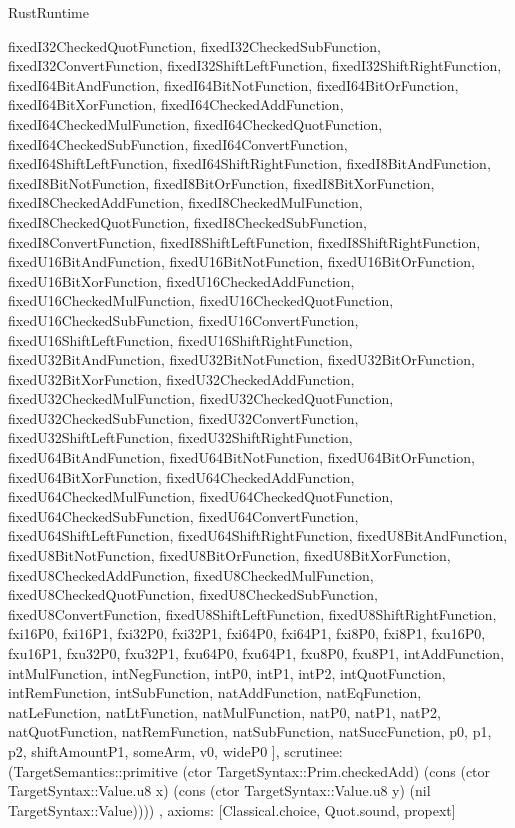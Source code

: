 \begin{lexlean}{RustRuntime}
\begin{semanticmodule}
{{      fixedI32CheckedQuotFunction,
      fixedI32CheckedSubFunction,
      fixedI32ConvertFunction,
      fixedI32ShiftLeftFunction,
      fixedI32ShiftRightFunction,
      fixedI64BitAndFunction,
      fixedI64BitNotFunction,
      fixedI64BitOrFunction,
      fixedI64BitXorFunction,
      fixedI64CheckedAddFunction,
      fixedI64CheckedMulFunction,
      fixedI64CheckedQuotFunction,
      fixedI64CheckedSubFunction,
      fixedI64ConvertFunction,
      fixedI64ShiftLeftFunction,
      fixedI64ShiftRightFunction,
      fixedI8BitAndFunction,
      fixedI8BitNotFunction,
      fixedI8BitOrFunction,
      fixedI8BitXorFunction,
      fixedI8CheckedAddFunction,
      fixedI8CheckedMulFunction,
      fixedI8CheckedQuotFunction,
      fixedI8CheckedSubFunction,
      fixedI8ConvertFunction,
      fixedI8ShiftLeftFunction,
      fixedI8ShiftRightFunction,
      fixedU16BitAndFunction,
      fixedU16BitNotFunction,
      fixedU16BitOrFunction,
      fixedU16BitXorFunction,
      fixedU16CheckedAddFunction,
      fixedU16CheckedMulFunction,
      fixedU16CheckedQuotFunction,
      fixedU16CheckedSubFunction,
      fixedU16ConvertFunction,
      fixedU16ShiftLeftFunction,
      fixedU16ShiftRightFunction,
      fixedU32BitAndFunction,
      fixedU32BitNotFunction,
      fixedU32BitOrFunction,
      fixedU32BitXorFunction,
      fixedU32CheckedAddFunction,
      fixedU32CheckedMulFunction,
      fixedU32CheckedQuotFunction,
      fixedU32CheckedSubFunction,
      fixedU32ConvertFunction,
      fixedU32ShiftLeftFunction,
      fixedU32ShiftRightFunction,
      fixedU64BitAndFunction,
      fixedU64BitNotFunction,
      fixedU64BitOrFunction,
      fixedU64BitXorFunction,
      fixedU64CheckedAddFunction,
      fixedU64CheckedMulFunction,
      fixedU64CheckedQuotFunction,
      fixedU64CheckedSubFunction,
      fixedU64ConvertFunction,
      fixedU64ShiftLeftFunction,
      fixedU64ShiftRightFunction,
      fixedU8BitAndFunction,
      fixedU8BitNotFunction,
      fixedU8BitOrFunction,
      fixedU8BitXorFunction,
      fixedU8CheckedAddFunction,
      fixedU8CheckedMulFunction,
      fixedU8CheckedQuotFunction,
      fixedU8CheckedSubFunction,
      fixedU8ConvertFunction,
      fixedU8ShiftLeftFunction,
      fixedU8ShiftRightFunction,
      fxi16P0,
      fxi16P1,
      fxi32P0,
      fxi32P1,
      fxi64P0,
      fxi64P1,
      fxi8P0,
      fxi8P1,
      fxu16P0,
      fxu16P1,
      fxu32P0,
      fxu32P1,
      fxu64P0,
      fxu64P1,
      fxu8P0,
      fxu8P1,
      intAddFunction,
      intMulFunction,
      intNegFunction,
      intP0,
      intP1,
      intP2,
      intQuotFunction,
      intRemFunction,
      intSubFunction,
      natAddFunction,
      natEqFunction,
      natLeFunction,
      natLtFunction,
      natMulFunction,
      natP0,
      natP1,
      natP2,
      natQuotFunction,
      natRemFunction,
      natSubFunction,
      natSuccFunction,
      p0,
      p1,
      p2,
      shiftAmountP1,
      someArm,
      v0,
      wideP0
    ],
    scrutinee: (TargetSemantics::primitive (ctor TargetSyntax::Prim.checkedAdd) (cons (ctor TargetSyntax::Value.u8 x) (cons (ctor TargetSyntax::Value.u8 y) (nil TargetSyntax::Value))))
  },
  axioms: [Classical.choice, Quot.sound, propext]
}


\end{semanticmodule}
\end{lexlean}
